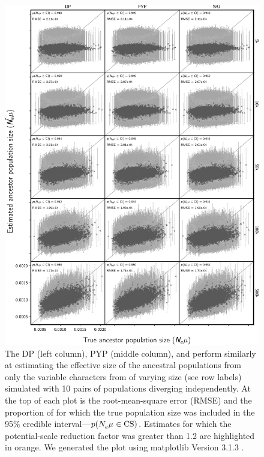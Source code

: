 \begin{figure}[htbp]
    \begin{center}
        \includegraphics[width=\textwidth,height=0.9\textheight,keepaspectratio]{../images/from-project-repo/var-only-nchars-ancestor-size-scatter-cropped.pdf}
        \captionsetup{name=Figure S, labelformat=noSpace, listformat=sFigList}
        \caption{\footnotesize
        The DP (left column),
        PYP (middle column),
        and
        \wunif
        perform similarly at estimating the effective size of the ancestral
        populations from only the variable characters from \datasets of varying
        size (see row labels) simulated with 10 pairs of populations diverging
        independently.
        At the top of each plot is the root-mean-square error (RMSE)
        and
        the proportion of \datasets for which the true population size was
        included in the 95\% credible interval---$p(N_{e}^{}\mu_{} \in
        \textrm{CS})$.
        Estimates for which the potential-scale reduction factor was greater
        than 1.2 \citep{Brooks1998} are highlighted in orange.
        We generated the plot using matplotlib Version 3.1.3
        \citep{matplotlib}.
        }
        \label{fig:varonlyancpopsizegridbysize}
    \end{center}
\end{figure}


